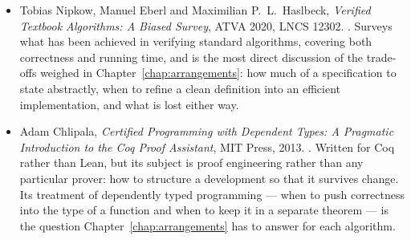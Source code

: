 \begin{itemize}
\item Tobias Nipkow, Manuel Eberl and Maximilian P.\ L.\ Haslbeck,
  \emph{Verified Textbook Algorithms: A Biased Survey}, ATVA 2020, LNCS 12302.
  .
  Surveys what has been achieved in verifying standard algorithms, covering both
  correctness and running time, and is the most direct discussion of the
  trade-offs weighed in Chapter~\ref{chap:arrangements}: how much of a
  specification to state abstractly, when to refine a clean definition into an
  efficient implementation, and what is lost either way.

\item Adam Chlipala, \emph{Certified Programming with Dependent Types: A
  Pragmatic Introduction to the Coq Proof Assistant}, MIT Press, 2013.
  .
  Written for Coq rather than Lean, but its subject is proof engineering rather
  than any particular prover: how to structure a development so that it survives
  change. Its treatment of dependently typed programming --- when to push
  correctness into the type of a function and when to keep it in a separate
  theorem --- is the question Chapter~\ref{chap:arrangements} has to answer for
  each algorithm.
\end{itemize}



